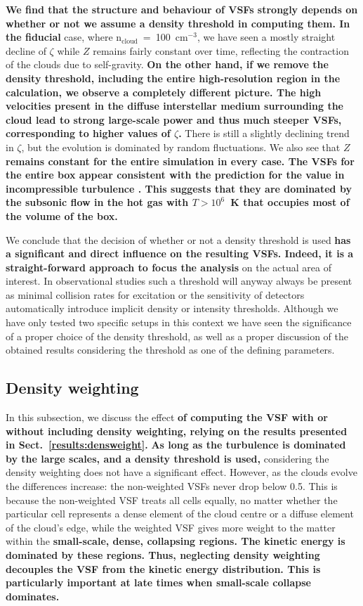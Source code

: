 \textbf{We find that the structure and behaviour of VSFs strongly depends on whether or not we assume a density threshold in computing them.
In the fiducial} case, where n$_\mathrm{cloud}$~=~100~cm$^{-3}$, we have seen a mostly straight decline of $\zeta$ while $Z$ remains fairly constant over time, reflecting the contraction of the clouds due to self-gravity.
\textbf{On the other hand, if we remove the density threshold, including the entire high-resolution region in the calculation, we observe a completely different picture.
The high velocities present in the diffuse interstellar medium surrounding the cloud lead to strong large-scale power and thus much steeper VSFs, corresponding to higher values of $\zeta$. }
There is still a slightly declining trend in $\zeta$, but the evolution is dominated by random fluctuations.
We also see that \textbf{$Z$ remains constant for the entire simulation in every case.
The VSFs for the entire box appear consistent with the prediction for the value in incompressible turbulence \citep{Boldyrev2002}. This suggests that they are dominated by the subsonic flow in the hot gas with $T > 10^6$~K that occupies most of the volume of the box.}

We conclude that the decision of whether or not a density threshold is used \textbf{has a significant and direct influence on the resulting VSFs.
Indeed, it is a straight-forward approach to focus the analysis} on the actual area of interest.
In observational studies such a threshold will anyway always be present as minimal collision rates for excitation or the sensitivity of detectors automatically introduce implicit density or intensity thresholds. 
Although we have only tested two specific setups in this context we have seen the significance of a proper choice of the density threshold, as well as a proper discussion of the obtained results considering the threshold as one of the defining parameters.

\subsection{Density weighting}\label{discussion:densweight}


In this subsection, we discuss the effect \textbf{of computing the VSF with or without including density weighting, relying on the results presented in Sect.~\ref{results:densweight}.}
\textbf{As long as the turbulence is dominated by the large scales, and a density threshold is used,} considering the density weighting does not have a significant effect.
However, as the clouds evolve the differences increase:
the non-weighted VSFs never drop below 0.5.
This is because the non-weighted VSF treats all cells equally, no matter whether the particular cell represents a dense element of the cloud centre or a diffuse element of the cloud's edge, while the weighted VSF gives more weight to the matter within the \textbf{small-scale, dense, collapsing regions.
The kinetic energy is dominated by these regions.
Thus, neglecting density weighting decouples the VSF from the kinetic energy distribution. 
This is particularly important at late times when small-scale collapse dominates.}

